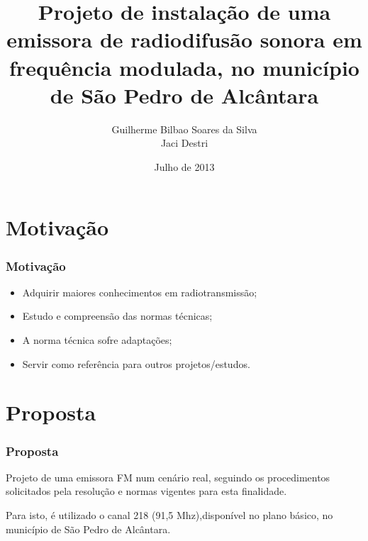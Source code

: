 \documentclass{beamer}
\title{Projeto de instalação de uma emissora de radiodifusão sonora em frequência modulada, no município de São Pedro de Alcântara}
\subtitle{}
\author[Guilherme Bilbao Soares da Silva]{Guilherme Bilbao Soares da Silva\\Jaci Destri}
\institute[IFSC]{
    Instituto Federal de Santa Catarina -- IFSC\\
    Campus São José \\
    \url{}
    }
\date{Julho de 2013}
\begin{document}
    \begin{frame}
	    \maketitle
    \end{frame}



    \section{Motivação}
    \begin{frame}
    \frametitle{Motivação}
      \begin{itemize}
      \item Adquirir maiores conhecimentos em radiotransmissão;
      \item Estudo e compreensão das normas técnicas;
	\item A norma técnica sofre adaptações;
	\item Servir como referência para outros projetos/estudos.
	\end{itemize}

    \end{frame}


    \section{Proposta}

    \begin{frame}
	    \frametitle{Proposta}


	    Projeto de uma emissora FM num cenário real,
	    seguindo os procedimentos solicitados pela resolução
	    e normas vigentes para esta finalidade.
	    
	    Para isto, é utilizado o canal 218 (91,5 Mhz),disponível no plano básico,
	    no município de São Pedro de Alcântara.
	    
	  
    \end{frame}
    
\end{document}
